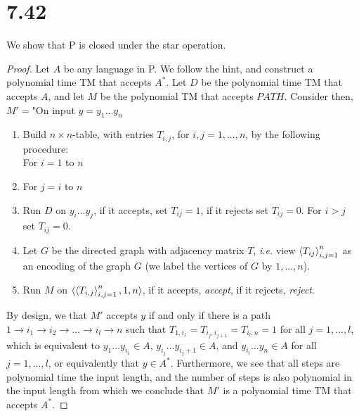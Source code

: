 \documentclass[a4paper,11pt]{article}
\newcommand{\ie}{\emph{i.e.} }
\numberwithin{equation}{section}
\begin{document}
\section*{7.42}
We show that P is closed under the star operation.
\begin{proof}
	Let $ A $ be any language in P. We follow the hint, and construct a polynomial time TM that accepts $ A^* $. Let $ D $ be the polynomial time TM that accepts $ A $, and let $ M $ be the polynomial TM that accepts $ PATH $. Consider then, $ M'= $"On input $ y=y_1...y_n $
	\begin{enumerate}
		\item Build $ n\times n $-table, with entries $ T_{i,j} $, for $ i,j=1,...,n $, by the following procedure:\\
		For $ i=1 $ to $ n $
		\item\qquad For $ j=i $ to $ n $
			\item\begin{addmargin}[4em]{0em} Run $ D $ on $ y_i...y_j $, if it accepts, set $ T_{ij}=1 $, if it rejects set $ T_{ij}=0 $. For $ i>j $ set $ T_{ij}=0 $.
				\end{addmargin}
		\item Let $ G $ be the directed graph with adjacency matrix $ T $, \ie view $ \braket{T_{ij}}_{i,j=1}^{n} $ as an encoding of the graph $ G $ (we label the vertices of $ G $ by $ 1,...,n $).
		\item Run $ M $ on $ \braket{\braket{T_{i,j}}_{i,j=1}^{n},1,n} $, if it accepts, \emph{accept}, if it rejects, \emph{reject}. 
	\end{enumerate}
	By design, we that $ M' $ accepts $ y $ if and only if there is a path $ 1\to i_1\to i_2\to...\to i_l\to n $ such that $ T_{1,i_1}=T_{i_j,i_{j+1}}=T_{i_l,n}=1 $ for all $ j=1,...,l $, which is equivalent to $ y_1...y_{i_1}\in A $, $ y_{i_j}...y_{i_j+1}\in A $, and $ y_{i_l}...y_{n}\in A $ for all $ j=1,...,l $, or equivalently that $ y\in A^* $. Furthermore, we see that all steps are polynomial time the input length, and the number of steps is also polynomial in the input length from which we conclude that $ M' $ is a polynomial time TM that accepts $ A^* $. 
\end{proof}
\end{document}
